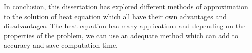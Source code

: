 \documentclass[00main.tex]{subfiles}
\begin{document}
In conclusion, this dissertation has explored different methods of approximation to the solution of heat equation which all have their own advantages and disadvantages. The heat equation has many applications and depending on the properties of the problem, we can use an adequate method which can add to accuracy and save computation time. 


\end{document}
